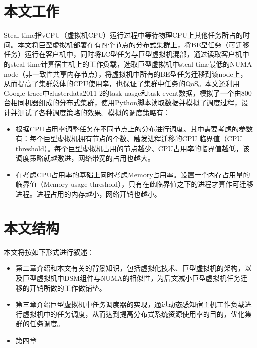 \section{本文工作}
Steal time指vCPU（虚拟机CPU）运行过程中等待物理CPU上其他任务所占的时间。本文将巨型虚拟机部署在有四个节点的分布式集群上，将BE型任务（可迁移任务）运行在客户机中，同时将LC型任务与巨型虚拟机混部，通过读取客户机中的steal time计算宿主机上的工作负载，选取巨型虚拟机中steal time最低的NUMA node（非一致性共享内存节点），将虚拟机中所有的BE型任务迁移到该node上，从而提高了集群总体的CPU使用率，也保证了集群中任务的QoS。本文还利用Google trace中clusterdata2011-2的task-uasge和task-event数据，模拟了一个由800台相同机器组成的分布式集群，使用Python脚本读取数据并模拟了调度过程，设计并测试了各种调度策略的效果。模拟的调度策略有：
\begin{itemize}
  \item 根据CPU占用率调整任务在不同节点上的分布进行调度。其中需要考虑的参数有：每个巨型虚拟机拥有节点的个数、触发进程迁移的CPU 临界值（CPU threshold）。每个巨型虚拟机占用的节点越少、CPU占用率的临界值越低，该调度策略就越激进，网络带宽的占用也越大。
  \item 在考虑CPU占用率的基础上同时考虑Memory占用率。设置一个内存占用量的临界值（Memory usage threshold），只有在此临界值之下的进程才算作可迁移进程。进程占用的内存越小，网络开销也越小。
\end{itemize}

\section{本文结构}
本文将按如下形式进行叙述：
\begin{itemize}
  \item 第二章介绍和本文有关的背景知识，包括虚拟化技术、巨型虚拟机的架构，以及巨型虚拟机中DSM组件与NUMA的相似性，为后文减小巨型虚拟机任务迁移的开销所做的工作做铺垫。
  \item 第三章介绍巨型虚拟机中任务调度器的实现，通过动态感知宿主机工作负载进行虚拟机中的任务调度，从而达到提高分布式系统资源使用率的目的，优化集群的任务调度。
  \item 第四章
\end{itemize}